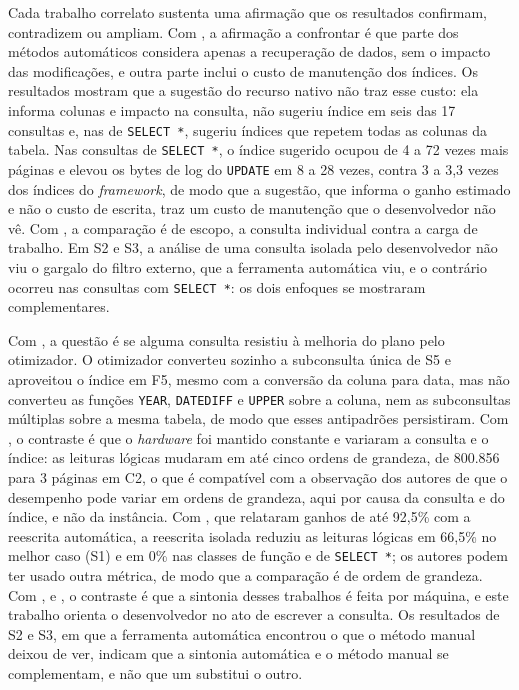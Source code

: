 Cada trabalho correlato sustenta uma afirmação que os resultados confirmam, contradizem ou ampliam. Com , a afirmação a confrontar é que parte dos métodos automáticos considera apenas a recuperação de dados, sem o impacto das modificações, e outra parte inclui o custo de manutenção dos índices. Os resultados mostram que a sugestão do recurso nativo não traz esse custo: ela informa colunas e impacto na consulta, não sugeriu índice em seis das 17 consultas e, nas de \texttt{SELECT *}, sugeriu índices que repetem todas as colunas da tabela. Nas consultas de \texttt{SELECT *}, o índice sugerido ocupou de 4 a 72 vezes mais páginas e elevou os bytes de log do \texttt{UPDATE} em 8 a 28 vezes, contra 3 a 3,3 vezes dos índices do \textit{framework}, de modo que a sugestão, que informa o ganho estimado e não o custo de escrita, traz um custo de manutenção que o desenvolvedor não vê. Com , a comparação é de escopo, a consulta individual contra a carga de trabalho. Em S2 e S3, a análise de uma consulta isolada pelo desenvolvedor não viu o gargalo do filtro externo, que a ferramenta automática viu, e o contrário ocorreu nas consultas com \texttt{SELECT *}: os dois enfoques se mostraram complementares. 

Com , a questão é se alguma consulta resistiu à melhoria do plano pelo otimizador. O otimizador converteu sozinho a subconsulta única de S5 e aproveitou o índice em F5, mesmo com a conversão da coluna para data, mas não converteu as funções \texttt{YEAR}, \texttt{DATEDIFF} e \texttt{UPPER} sobre a coluna, nem as subconsultas múltiplas sobre a mesma tabela, de modo que esses antipadrões persistiram. Com , o contraste é que o \textit{hardware} foi mantido constante e variaram a consulta e o índice: as leituras lógicas mudaram em até cinco ordens de grandeza, de 800.856 para 3 páginas em C2, o que é compatível com a observação dos autores de que o desempenho pode variar em ordens de grandeza, aqui por causa da consulta e do índice, e não da instância. Com , que relataram ganhos de até 92,5\% com a reescrita automática, a reescrita isolada reduziu as leituras lógicas em 66,5\% no melhor caso (S1) e em 0\% nas classes de função e de \texttt{SELECT *}; os autores podem ter usado outra métrica, de modo que a comparação é de ordem de grandeza. Com ,  e , o contraste é que a sintonia desses trabalhos é feita por máquina, e este trabalho orienta o desenvolvedor no ato de escrever a consulta. Os resultados de S2 e S3, em que a ferramenta automática encontrou o que o método manual deixou de ver, indicam que a sintonia automática e o método manual se complementam, e não que um substitui o outro.

